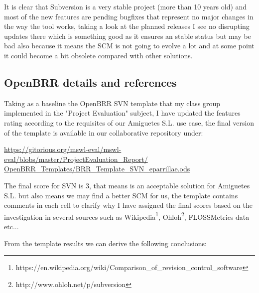 \documentclass[a4paper,10pt]{article}
\begin{document}
It is clear that Subversion is a very stable project (more than 10 years old)
and most of the new features are pending bugfixes that represent no major
changes in the way the tool works, taking a look at the planned releases I see
no disrupting updates there which is something good as it ensures an stable
status but may be bad also because it means the SCM is not going to evolve a lot
and at some point it could become a bit obsolete compared with other solutions.

\subsection{OpenBRR details and references}

Taking as a baseline the OpenBRR SVN template that my class group implemented in the "Project
Evaluation" subject, I have updated the features rating according to the
requisites of our Amiguetes S.L. use case, the final version of the template is available in our collaborative repository under:

\url{
https://gitorious.org/mswl-eval/mswl-eval/blobs/master/ProjectEvaluation_Report/
OpenBRR_Templates/BRR_Template_SVN_eparrillae.ods}

The final score for SVN is 3, that means is an acceptable solution for Amiguetes S.L. but also means we may find a better SCM for us, the template contains comments in each cell to clarify why I have assigned the final scores based on the investigation in several sources such as Wikipedia\footnote{https://en.wikipedia.org/wiki/Comparison\_of\_revision\_control\_software}, Ohloh\footnote{http://www.ohloh.net/p/subversion}, FLOSSMetrics data etc...

From the template results we can derive the following conclusions:
\end{document}
